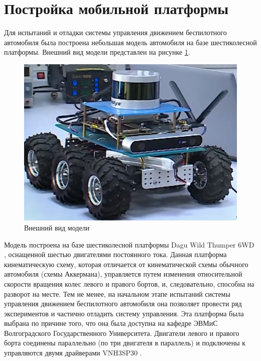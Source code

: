 \section{Постройка мобильной платформы}
Для испытаний и отладки системы управления движением беспилотного автомобиля была построена небольшая
модель автомобиля на базе шестиколесной платформы. Внешний вид модели представлен на рисунке
\ref{img:jetson_car}.

\begin{figure}[h]
    \centering
    \includegraphics[width=\linewidth]{images/car}
    \caption{Внешний вид модели}
    \label{img:jetson_car}
\end{figure}

Модель построена на базе шестиколесной платформы Dagu Wild Thumper 6WD \cite{jetson_car_6wd}, оснащенной шестью
двигателями постоянного тока. Данная платформа кинематическую схему, которая отличается от кинематической схемы
обычного автомобиля (схемы Аккермана), управляется путем изменения относительной скорости вращения колес левого
и правого бортов, и, следовательно, способна на разворот на месте. Тем не менее, на начальном этапе испытаний
системы управления движением беспилотного автомобиля она позволяет провести ряд экспериментов и частично
отладить систему управления. Эта платформа была выбрана по причине того, что она была доступна на кафедре
ЭВМиС Волгоградского Государственного Университета. Двигатели левого и правого борта соединены параллельно
(по три двигателя в параллель) и подключены к управляются двумя драйверами VNH3SP30 \cite{jetson_car_driver}.

